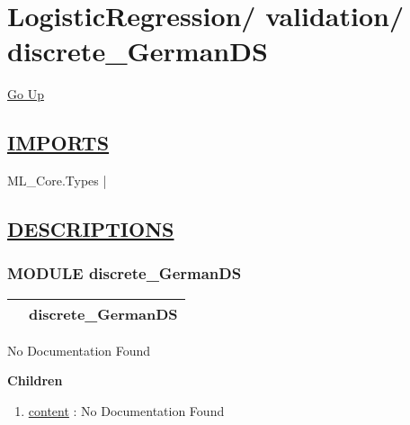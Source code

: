\chapter*{\color{headfile}
{\large LogisticRegression\slash\hspace{0pt}}
{\large validation\slash\hspace{0pt}}
 \\
discrete_GermanDS
}
\hypertarget{ecldoc:toc:LogisticRegression.validation.discrete_GermanDS}{}
\hyperlink{ecldoc:toc:root/LogisticRegression/validation}{Go Up}

\section*{\underline{\textsf{IMPORTS}}}
\begin{doublespace}
{\large
ML\_Core.Types |
}
\end{doublespace}

\section*{\underline{\textsf{DESCRIPTIONS}}}
\subsection*{\textsf{\colorbox{headtoc}{\color{white} MODULE}
discrete\_GermanDS}}

\hypertarget{ecldoc:LogisticRegression.validation.discrete_GermanDS}{}

{\renewcommand{\arraystretch}{1.5}
\begin{tabularx}{\textwidth}{|>{\raggedright\arraybackslash}l|X|}
\hline
\hspace{0pt}\mytexttt{\color{red} } & \textbf{discrete\_GermanDS} \\
\hline
\end{tabularx}
}

\par





No Documentation Found







\textbf{Children}
\begin{enumerate}
\item \hyperlink{ecldoc:logisticregression.validation.discrete_germands.content}{content}
: No Documentation Found
\end{enumerate}

